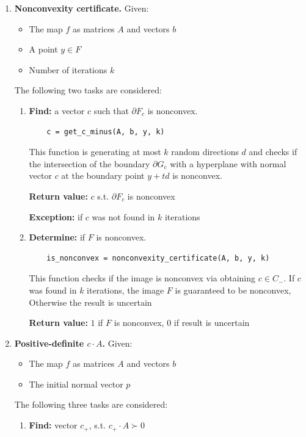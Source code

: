 \documentclass[a4paper]{article}
\theoremstyle{definition}
\begin{document}
\begin{enumerate}
\begin{enumerate}
{\bf Return value:} the normal vector $c$ s.t. $y+td\in\partial G_c$

{\bf Exception:} if optimization task failed, in particular, if $y\notin G$ or the normal vector does not exist at this point.
\end{enumerate}

\item {\bf Nonconvexity certificate.} Given:
\begin{itemize}
	\item The map $f$ as matrices $A$ and vectors $b$
	\item A point $y\in F$
	\item Number of iterations $k$
\end{itemize}
The following two tasks are considered:
\begin{enumerate}
	\item {\bf Find:} a vector $c$ such that $\partial F_c$ is nonconvex.
	
	\begin{verbatim}
	c = get_c_minus(A, b, y, k)
	\end{verbatim}
	This function is generating at most $k$ random directions $d$ and checks if the intersection of the boundary $\partial G_c$ with a hyperplane with normal vector $c$ at the boundary point $y+td$ is nonconvex.

	{\bf Return value:}  $c$ s.t. $\partial F_c$ is nonconvex
	
	{\bf Exception:} if $c$ was not found in $k$ iterations
	
	\item {\bf Determine:} if $F$ is nonconvex.
	
	\begin{verbatim}
	is_nonconvex = nonconvexity_certificate(A, b, y, k)
	\end{verbatim}
	
	This function checks if the image is nonconvex via obtaining $c\in C_-$. If $c$ was found in $k$ iterations, the image $F$ is guaranteed to be nonconvex, Otherwise the result is uncertain
	
	{\bf Return value:} $1$ if $F$ is nonconvex, $0$ if result is uncertain
\end{enumerate}

\item {\bf Positive-definite $c\cdot A$.} Given:
\begin{itemize}
	\item The map $f$ as matrices $A$ and vectors $b$
	\item The initial normal vector $p$
\end{itemize}
The following three tasks are considered:
\begin{enumerate}
	\item {\bf Find:} vector $c_+$, s.t. $c_+\cdot A\succ 0$
	

\end{enumerate}
\end{enumerate}
\end{document}
